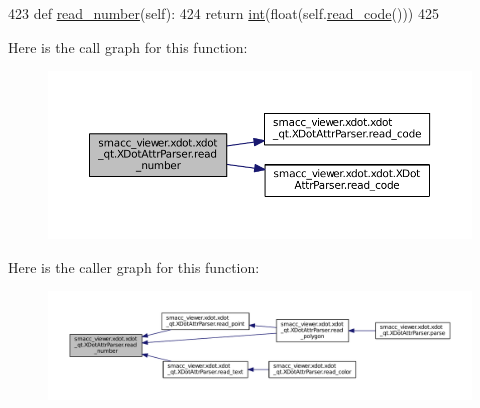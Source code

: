 \begin{DoxyCode}
423     \textcolor{keyword}{def }\hyperlink{classsmacc__viewer_1_1xdot_1_1xdot__qt_1_1XDotAttrParser_a6f88d7537e1f84df6d11f72177c75d21}{read\_number}(self):
424         \textcolor{keywordflow}{return} \hyperlink{classint}{int}(float(self.\hyperlink{classsmacc__viewer_1_1xdot_1_1xdot__qt_1_1XDotAttrParser_ac919c71f5e22d2724859560509294979}{read\_code}()))
425 
\end{DoxyCode}


Here is the call graph for this function\+:
\nopagebreak
\begin{figure}[H]
\begin{center}
\leavevmode
\includegraphics[width=350pt]{classsmacc__viewer_1_1xdot_1_1xdot__qt_1_1XDotAttrParser_a6f88d7537e1f84df6d11f72177c75d21_cgraph}
\end{center}
\end{figure}




Here is the caller graph for this function\+:
\nopagebreak
\begin{figure}[H]
\begin{center}
\leavevmode
\includegraphics[width=350pt]{classsmacc__viewer_1_1xdot_1_1xdot__qt_1_1XDotAttrParser_a6f88d7537e1f84df6d11f72177c75d21_icgraph}
\end{center}
\end{figure}


